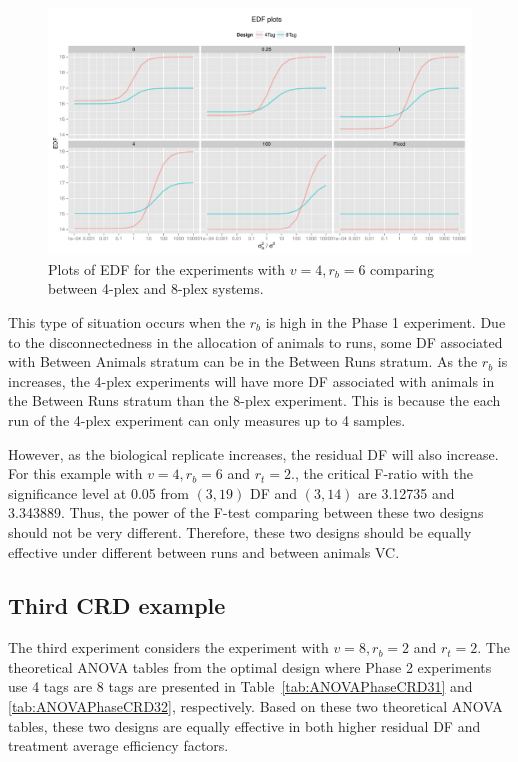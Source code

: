 \documentclass[12pt,a4paper]{article}
\begin{document}
\begin{figure}[ht]
\centering
\includegraphics[width=1 \textwidth]{Graph/CRD462Tag4vsTag8.pdf}
\caption{Plots of EDF for the experiments with $v = 4, r_b = 6$ comparing between 4-plex and 8-plex systems.}
\label{fig:compare44CRD}
\end{figure}

This type of situation occurs when the $r_b$ is high in the Phase 1 experiment. Due to the disconnectedness in the allocation of animals to runs, some DF associated with Between Animals stratum can be in the Between Runs stratum. As the $r_b$ is increases, the 4-plex experiments will have more DF associated with animals in the Between Runs stratum than the 8-plex experiment. This is because the each run of the 4-plex experiment can only measures up to 4 samples. 

However, as the biological replicate increases, the residual DF will also increase. For this example with $v = 4, r_b = 6$ and $r_t = 2$., the critical F-ratio with the significance level at 0.05 from $(3,19)$ DF and $(3,14)$ are  3.12735 and 3.343889. Thus, the power of the F-test comparing between these two designs should not be very different. Therefore, these two designs should be  equally effective under different between runs and between animals VC.

\subsection{Third CRD example}
The third experiment considers the experiment with $v = 8, r_b = 2$ and $r_t = 2$. The theoretical ANOVA tables from the optimal design where Phase 2 experiments use 4 tags are 8 tags are presented in Table~\ref{tab:ANOVAPhaseCRD31} and \ref{tab:ANOVAPhaseCRD32}, respectively. 
Based on these two theoretical ANOVA tables, these two designs are equally effective in both higher residual DF and treatment average efficiency factors. 
\end{document}
